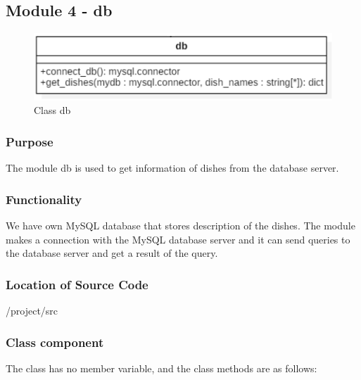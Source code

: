 \FloatBarrier

\subsection{Module 4 - db}

\begin{figure}[htbp]
\centerline{\includegraphics[width=\linewidth]{./pictures/class_db}}
\caption{Class db}
\label{fig:class_db}
\end{figure}
\FloatBarrier

\subsubsection {Purpose}

The module db is used to get information of dishes from the database server. \newline
\subsubsection {Functionality}

We have own MySQL database that stores description of the dishes. The module makes a connection with the MySQL database server and it can send queries to the database server and get a result of the query. \newline


\subsubsection {Location of Source Code}

/project/src \newline

\subsubsection {Class component}

The class has no member variable, and the class methods are as follows: \newline


